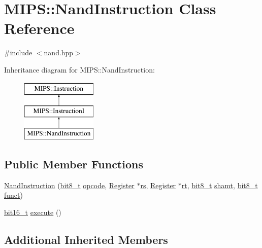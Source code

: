 \hypertarget{classMIPS_1_1NandInstruction}{}\section{M\+I\+PS\+:\+:Nand\+Instruction Class Reference}
\label{classMIPS_1_1NandInstruction}


{\ttfamily \#include $<$nand.\+hpp$>$}

Inheritance diagram for M\+I\+PS\+:\+:Nand\+Instruction\+:\begin{figure}[H]
\begin{center}
\leavevmode
\includegraphics[height=3.000000cm]{classMIPS_1_1NandInstruction}
\end{center}
\end{figure}
\subsection*{Public Member Functions}
\begin{DoxyCompactItemize}
\item 
\hyperlink{classMIPS_1_1NandInstruction_a1c401e26e08324e1ba50175c4a08f4e7}{Nand\+Instruction} (\hyperlink{core_8hpp_a6074bae122ae7b527864eec42c728c3c}{bit8\+\_\+t} \hyperlink{classMIPS_1_1Instruction_a45cc6808b5dde8a5d41067d148b55476}{opcode}, \hyperlink{classMIPS_1_1Register}{Register} $\ast$\hyperlink{classMIPS_1_1InstructionI_a2be191d5b3dce505e2e626ec02eb4d62}{rs}, \hyperlink{classMIPS_1_1Register}{Register} $\ast$\hyperlink{classMIPS_1_1InstructionI_add1db07a5c954f35271de8c8a5737487}{rt}, \hyperlink{core_8hpp_a6074bae122ae7b527864eec42c728c3c}{bit8\+\_\+t} \hyperlink{classMIPS_1_1InstructionI_aa9b6da37c374c2ec8d96448d341e5e7d}{shamt}, \hyperlink{core_8hpp_a6074bae122ae7b527864eec42c728c3c}{bit8\+\_\+t} \hyperlink{classMIPS_1_1InstructionI_a5c6efcbbd233a7447c1fe24ea0a1e558}{funct})
\item 
\hyperlink{core_8hpp_adc265a970bc35995b5879784bbb3f1b7}{bit16\+\_\+t} \hyperlink{classMIPS_1_1NandInstruction_a2e0266ebee3819e7b4d9bfb44f0e70ac}{execute} ()
\end{DoxyCompactItemize}
\subsection*{Additional Inherited Members}


